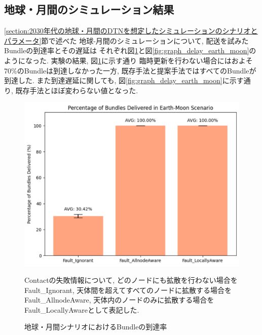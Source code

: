\subsection{地球・月間のシミュレーション結果}
\label{section:地球・月間のシミュレーション結果}
\ref{section:2030年代の地球・月間のDTNを想定したシミュレーションのシナリオとパラメータ}節で述べた
地球-月間のシミュレーションについて, 配送を試みたBundleの到達率とその遅延は
それぞれ図\ref{fig:graph_bundle_earth_moon}と図\ref{fig:graph_delay_earth_moon}のようになった. 
実験の結果, 図\ref{fig:graph_bundle_earth_moon}に示す通り
臨時更新を行わない場合にはおよそ70\%のBundleは到達しなかった一方, 
既存手法と提案手法ではすべてのBundleが到達した.
また到達遅延に関しても, 図\ref{fig:graph_delay_earth_moon}に示す通り, 
既存手法とほぼ変わらない値となった. 
\begin{figure}[tbh]
    \centering
    \includegraphics[width=0.7\textheight]{img/moon_bundle.pdf}
    \caption{地球・月間シナリオにおけるBundleの到達率}
    \label{fig:graph_bundle_earth_moon}
    \begin{minipage}{\textwidth}
        \centering
        \vspace{3mm}
        \fontsize{10.5pt}{12pt}\selectfont
        Contactの失敗情報について, どのノードにも拡散を行わない場合をFault\_Ignorant, 
        天体間を超えてすべてのノードに拡散する場合をFault\_AllnodeAware, 
        天体内のノードのみに拡散する場合をFault\_LocallyAwareとして表記した. 
    \end{minipage}
\end{figure}

